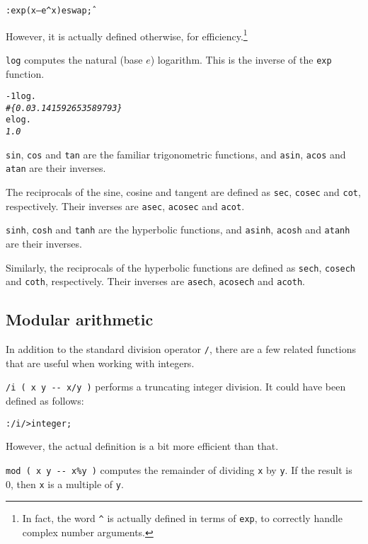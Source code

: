 \documentclass[english]{article}
\begin{document}
\begin{alltt}
: exp ( x -- e^x ) e swap \^ ;
\end{alltt}

However, it is actually defined otherwise, for efficiency.\footnote{In fact, the word \texttt{\^{}} is actually defined in terms of \texttt{exp}, to correctly handle complex number arguments.}

\texttt{log} computes the natural (base $e$) logarithm. This is the inverse of the \texttt{exp} function.

\begin{alltt}
-1 log .
\emph{\#\{ 0.0 3.141592653589793 \}}
e log .
\emph{1.0}
\end{alltt}

\texttt{sin}, \texttt{cos} and \texttt{tan} are the familiar trigonometric functions, and \texttt{asin}, \texttt{acos} and \texttt{atan} are their inverses.

The reciprocals of the sine, cosine and tangent are defined as \texttt{sec}, \texttt{cosec} and \texttt{cot}, respectively. Their inverses are \texttt{asec}, \texttt{acosec} and \texttt{acot}.

\texttt{sinh}, \texttt{cosh} and \texttt{tanh} are the hyperbolic functions, and \texttt{asinh}, \texttt{acosh} and \texttt{atanh} are their inverses.

Similarly, the reciprocals of the hyperbolic functions are defined as \texttt{sech}, \texttt{cosech} and \texttt{coth}, respectively. Their inverses are \texttt{asech}, \texttt{acosech} and \texttt{acoth}.

\subsection{Modular arithmetic}

In addition to the standard division operator \texttt{/}, there are a few related functions that are useful when working with integers.

\texttt{/i ( x y -{}- x/y )} performs a truncating integer division. It could have been defined as follows:

\begin{alltt}
: /i / >integer ;
\end{alltt}

However, the actual definition is a bit more efficient than that.

\texttt{mod ( x y -{}- x\%y )} computes the remainder of dividing \texttt{x} by \texttt{y}. If the result is 0, then \texttt{x} is a multiple of \texttt{y}.
\end{document}
